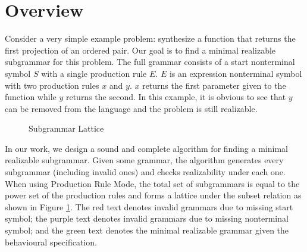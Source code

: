 \documentclass[acmsmall, nonacm]{acmart}
\begin{document}
\section{Overview}



Consider a very simple example problem: synthesize a function that returns the first projection of an ordered pair. Our goal is to find a minimal realizable subgrammar for this problem. The full grammar consists of a start nonterminal symbol $S$ with a single production rule $E$. $E$ is an expression nonterminal symbol with two production rules $x$ and $y$. $x$ returns the first parameter given to the function while $y$ returns the second. In this example, it is obvious to see that $y$ can be removed from the language and the problem is still realizable.

\begin{figure}[H]
  \caption{Subgrammar Lattice}
  \label{fig:lattice}
\end{figure}

In our work, we design a sound and complete algorithm for finding a minimal realizable subgrammar. Given some grammar, the algorithm generates every subgrammar (including invalid ones) and checks realizability under each one. When using Production Rule Mode, the total set of subgrammars is equal to the power set of the production rules and forms
a lattice under the subset relation as shown in Figure \ref{fig:lattice}. The red text denotes invalid grammars due to missing start symbol; the purple text denotes invalid grammars due to missing nonterminal symbol; and the green text denotes the minimal realizable grammar given the behavioural specification.
\end{document}
